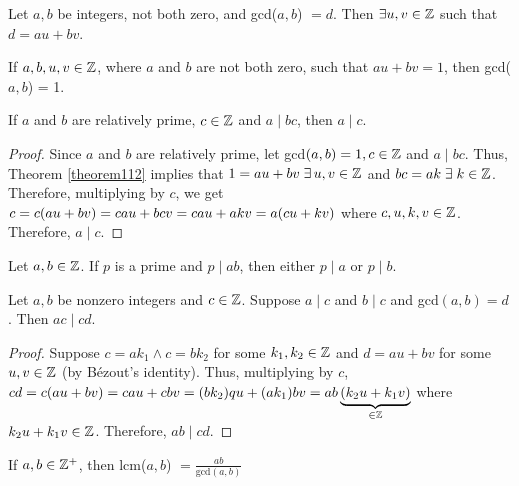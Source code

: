 \begin{theorem}
   Let $a, b$ be integers, not both zero, and gcd($a, b$) $= d$. Then $\exists u, v \in \mathbb{Z}$ such that $d = au + bv$.
\end{theorem}


\begin{theorem}
    \label{theorem112}
    If $a, b, u, v \in \mathbb{Z}$, where $a$ and $b$ are not both zero, such that $au + bv = 1$, then gcd($a, b$) = 1.
\end{theorem}


\begin{exercise}[Prove]
    If $a$ and $b$ are relatively prime, $c \in \mathbb{Z}$ and $a \mid bc$, then $a \mid c$.
\end{exercise}

\begin{proof}
    Since $a$ and $b$ are relatively prime, let gcd$(a, b) = 1, c \in \mathbb{Z}$ and $a \mid bc$. Thus, Theorem \ref{theorem112} implies that $1 = au + bv \; \exists \, u, v \in \mathbb{Z}$ and $bc = ak \; \exists \; k \in \mathbb{Z}$. Therefore, multiplying by $c$, we get $c = c \qty(au + bv) = cau + bcv = cau + akv = a \qty(cu + kv)$ where $c, u, k, v \in \mathbb{Z}$. Therefore, $a \mid c$. \qedsymbol
\end{proof}

\begin{theorem}
    Let $a, b \in \mathbb{Z}$. If $p$ is a prime and $p \mid ab$, then either $p \mid a$ or $p \mid b$.
\end{theorem}



\begin{exercise}[Prove]
    Let $a, b$ be nonzero integers and $c \in \mathbb{Z}$. Suppose $a \mid c$ and $b \mid c$ and gcd$(a, b) = d$. Then $ac \mid cd$.
\end{exercise}

\begin{proof}
    Suppose $c = ak_1 \land c = bk_2$ for some $k_1, k_2 \in \mathbb{Z}$ and $d = au + bv$ for some $u, v \in \mathbb{Z}$ (by Bézout's identity). Thus, multiplying by $c$, $cd = c \qty(au + bv) = cau + cbv = \qty(bk_2)qu + \qty(ak_1)bv = ab \underbrace{\qty(k_2u + k_1v)}_{\in \mathbb{Z}}$ where $k_2u + k_1v \in \mathbb{Z}$. Therefore, $ab \mid cd$. \qedsymbol
\end{proof}

\begin{theorem}
    If $a, b \in \mathbb{Z}^+$, then lcm($a, b$) $= \frac{ab}{\text{gcd}(a, b)}$
\end{theorem}

